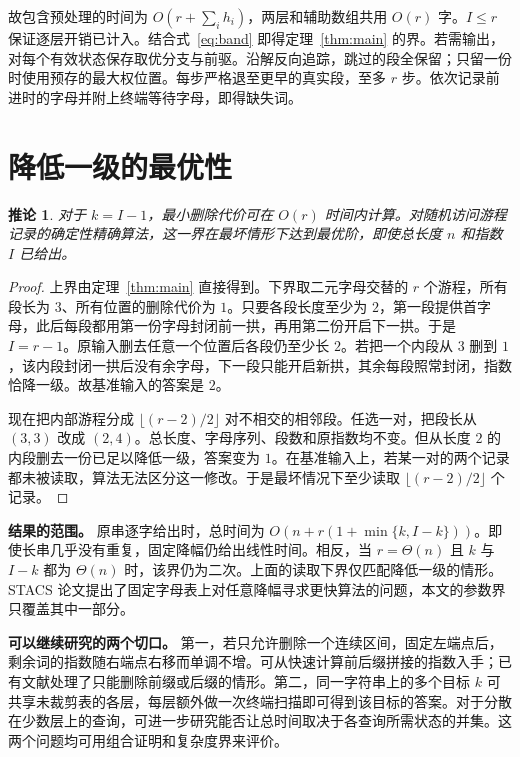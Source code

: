\documentclass[UTF8,11pt,a4paper,fontset=fandol]{ctexart}
\theoremstyle{zh}
\newtheorem{corollary}[theorem]{推论}
\newcommand{\pagehead}[1]{\clearpage\section{#1}}
\begin{document}
故包含预处理的时间为 $O(r+\sum_i h_i)$，两层和辅助数组共用 $O(r)$ 字。$I\le r$ 保证逐层开销已计入。结合式~\eqref{eq:band} 即得定理~\ref{thm:main} 的界。若需输出，对每个有效状态保存取优分支与前驱。沿解反向追踪，跳过的段全保留；只留一份时使用预存的最大权位置。每步严格退至更早的真实段，至多 $r$ 步。依次记录前进时的字母并附上终端等待字母，即得缺失词。

\pagehead{降低一级的最优性}
\begin{corollary}
对于 $k=I-1$，最小删除代价可在 $O(r)$ 时间内计算。对随机访问游程记录的确定性精确算法，这一界在最坏情形下达到最优阶，即使总长度 $n$ 和指数 $I$ 已给出。
\end{corollary}
\begin{proof}
上界由定理~\ref{thm:main} 直接得到。下界取二元字母交替的 $r$ 个游程，所有段长为 $3$、所有位置的删除代价为 $1$。只要各段长度至少为 $2$，第一段提供首字母，此后每段都用第一份字母封闭前一拱，再用第二份开启下一拱。于是 $I=r-1$。原输入删去任意一个位置后各段仍至少长 $2$。若把一个内段从 $3$ 删到 $1$，该内段封闭一拱后没有余字母，下一段只能开启新拱，其余每段照常封闭，指数恰降一级。故基准输入的答案是 $2$。

现在把内部游程分成 $\lfloor(r-2)/2\rfloor$ 对不相交的相邻段。任选一对，把段长从 $(3,3)$ 改成 $(2,4)$。总长度、字母序列、段数和原指数均不变。但从长度 $2$ 的内段删去一份已足以降低一级，答案变为 $1$。在基准输入上，若某一对的两个记录都未被读取，算法无法区分这一修改。于是最坏情况下至少读取 $\lfloor(r-2)/2\rfloor$ 个记录。
\end{proof}

\noindent\textbf{结果的范围。}
原串逐字给出时，总时间为 $O(n+r(1+\min\{k,I-k\}))$。即使长串几乎没有重复，固定降幅仍给出线性时间。相反，当 $r=\Theta(n)$ 且 $k$ 与 $I-k$ 都为 $\Theta(n)$ 时，该界仍为二次。上面的读取下界仅匹配降低一级的情形。STACS 论文\cite[第 5 节]{day}提出了固定字母表上对任意降幅寻求更快算法的问题，本文的参数界只覆盖其中一部分。

\noindent\textbf{可以继续研究的两个切口。}
第一，若只允许删除一个连续区间，固定左端点后，剩余词的指数随右端点右移而单调不增。可从快速计算前后缀拼接的指数入手；已有文献处理了只能删除前缀或后缀的情形\cite{barker}。第二，同一字符串上的多个目标 $k$ 可共享未裁剪表的各层，每层额外做一次终端扫描即可得到该目标的答案。对于分散在少数层上的查询，可进一步研究能否让总时间取决于各查询所需状态的并集。这两个问题均可用组合证明和复杂度界来评价。
\end{document}
